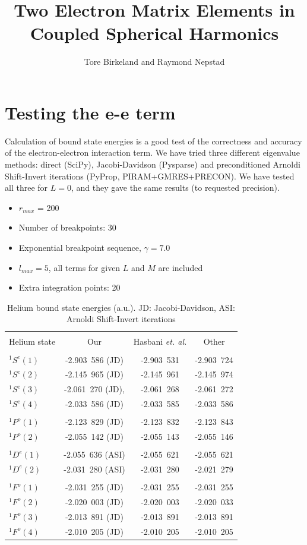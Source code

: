 \documentclass[a4paper,12pt]{paper}
\title{Two Electron Matrix Elements in Coupled Spherical Harmonics}
\author{Tore Birkeland and Raymond Nepstad}
\begin{document}
\section{Testing the e-e term}
Calculation of bound state energies is a good test of the correctness and accuracy of the electron-electron interaction term. We have tried three different eigenvalue methods: direct (SciPy), Jacobi-Davidson (Pysparse) and preconditioned Arnoldi Shift-Invert iterations (PyProp, PIRAM+GMRES+PRECON). We have tested all three for $L=0$, and they gave the same results (to requested precision).

\begin{itemize}
	\item $r_{max}$ = 200
	\item Number of breakpoints: 30
	\item Exponential breakpoint sequence, $\gamma = 7.0$
	\item $l_{max} = 5$, all terms for given $L$ and $M$ are included
	\item Extra integration points: 20
\end{itemize}

\begin{table}
\centering
\begin{tabular}{lccc}
	\hline\\
	Helium state & Our & Hasbani \textit{et. al.} & Other\\
	\hline\\
	$^1S^e(1)$ & -2.903\ 586 (JD) & -2.903\ 531 & -2.903\ 724\\
	$^1S^e(2)$ & -2.145\ 965 (JD) & -2.145\ 961 & -2.145\ 974\\
	$^1S^e(3)$ & -2.061\ 270 (JD), & -2.061\ 268 & -2.061\ 272\\
	$^1S^e(4)$ & -2.033\ 586 (JD) & -2.033\ 585 & -2.033\ 586\\
	\\
	$^1P^o(1)$ & -2.123\ 829 (JD) & -2.123\ 832 & -2.123\ 843\\
	$^1P^o(2)$ & -2.055\ 142 (JD) & -2.055\ 143 & -2.055\ 146\\
	\\
	$^1D^e(1)$ & -2.055\ 636 (ASI) & -2.055\ 621 & -2.055\ 621\\
	$^1D^e(2)$ & -2.031\ 280 (ASI) & -2.031\ 280 & -2.021\ 279\\
	\\
	$^1F^o(1)$ & -2.031\ 255 (JD) & -2.031\ 255 & -2.031\ 255\\
	$^1F^o(2)$ & -2.020\ 003 (JD)& -2.020\ 003 & -2.020\ 033\\
	$^1F^o(3)$ & -2.013\ 891 (JD) & -2.013\ 891 & -2.013\ 891\\
	$^1F^o(4)$ & -2.010\ 205 (JD) & -2.010\ 205 & -2.010\ 205\\
\end{tabular}
\caption{Helium bound state energies (a.u.). JD: Jacobi-Davidson, ASI: Arnoldi Shift-Invert iterations}
\label{tab:}
\end{table}
\end{document}
